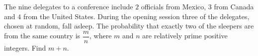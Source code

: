 The nine delegates to a conference include $2$ officials from Mexico, $3$ from Canada and $4$ from the United States. During the opening session three of the delegates, chosen at random, fall asleep. The probability that exactly two of the sleepers are from the same country is $\dfrac{m}{n}$, where $m$ and $n$ are relatively prime positive integers. Find $m+n$.
